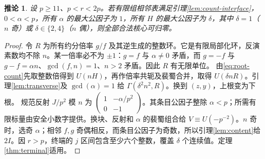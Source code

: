 \documentclass[11pt,a4paper]{article}
\newtheorem{corollary}[theorem]{推论}
\theoremstyle{definition}
\numberwithin{equation}{section}
\begin{document}
\begin{corollary}\label{cor:resource}
设 $p\ge11$、$p<r<2p$。若有限组相邻表满足引理\ref{lem:count-interface}，$0<\alpha<p$，所有 $\alpha$ 的最大公因子为 $1$，所有 $H$ 的最大公因子为 $\delta$，其中 $\delta=1$（$n$ 奇）或 $\delta\in\{2,4\}$（$n$ 偶），则全部合法核心可归零。
\end{corollary}
\begin{proof}
令 $R$ 为所有约分倍率 $g/f$ 及其逆生成的整数环。它是有限局部化环，反演素数均不除 $n$。某一倍率必不为 $\pm1$：$g=f$ 与 $\alpha\ne0$ 矛盾，而 $g=-f$ 与 $g-f=\alpha n$、$\gcd(f,n)=1$、$n>2$ 矛盾。因此 $R$ 有无限单位。
由\eqref{eq:root-count}先取整数倍得到 $U(nH)$，再作倍率共轭及裴蜀合并，取得 $U(\delta nR)$。引理\ref{lem:transverse}及 $\gcd(\alpha)=1$ 给 $\Gamma(\delta^2n^2,R)$。换到 $(z,y)$，上根变为下根。
规范反射 $J/p^2$ 模 $n$ 为 $\left(\begin{smallmatrix}1&-\alpha/p^2\\0&-1\end{smallmatrix}\right)$。其条目公因子整除 $\alpha<p$；所需有限标量由安全小数字提供。换块、反射和 $\alpha$ 的裴蜀组合给 $V\equiv U(-p^{-2})$。$n$ 奇时，选奇 $\alpha$；相邻 $f,g$ 奇偶相反，而条目公因子为奇数，所以引理\ref{lem:content}给 $2I$。因 $r>p$，终端的 $j$ 区间包含至少六个整数，覆盖 $\delta$ 个连续值。定理\ref{thm:terminal}适用。
\end{proof}
\end{document}
